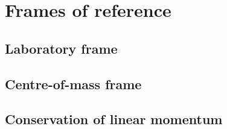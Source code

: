 \section{Frames of reference}
	
	\subsection{Laboratory frame}
	
	\subsection{Centre-of-mass frame}
	
	\subsection{Conservation of linear momentum}